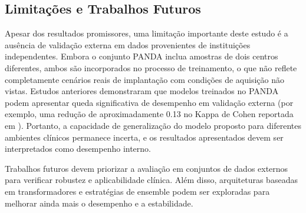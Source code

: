 \subsection{Limitações e Trabalhos Futuros}

Apesar dos resultados promissores, uma limitação importante deste estudo é a ausência de validação externa em dados provenientes de instituições independentes. Embora o conjunto PANDA inclua amostras de dois centros diferentes, ambos são incorporados no processo de treinamento, o que não reflete completamente cenários reais de implantação com condições de aquisição não vistas. Estudos anteriores demonstraram que modelos treinados no PANDA podem apresentar queda significativa de desempenho em validação externa (por exemplo, uma redução de aproximadamente 0.13 no Kappa de Cohen reportada em \cite{Xiang2023Prostate}). Portanto, a capacidade de generalização do modelo proposto para diferentes ambientes clínicos permanece incerta, e os resultados apresentados devem ser interpretados como desempenho interno.

Trabalhos futuros devem priorizar a avaliação em conjuntos de dados externos para verificar robustez e aplicabilidade clínica. Além disso, arquiteturas baseadas em transformadores e estratégias de ensemble podem ser exploradas para melhorar ainda mais o desempenho e a estabilidade.